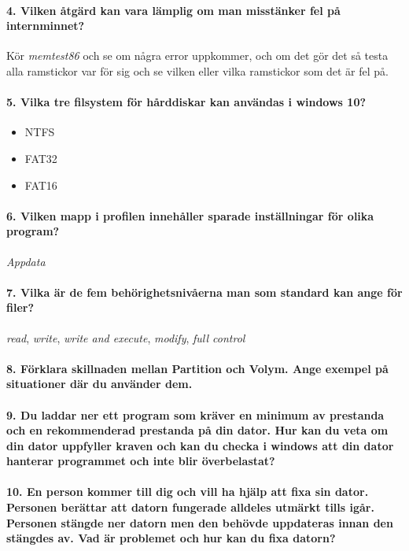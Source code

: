 \paragraph{4. Vilken åtgärd kan vara lämplig om man misstänker fel på internminnet?}
Kör \textit{memtest86} och se om några error uppkommer, och om det gör det så testa alla ramstickor var för sig och se vilken eller vilka ramstickor som det är fel på.

\paragraph{5. Vilka tre filsystem för hårddiskar kan användas i windows 10?}
\begin{itemize}
	\item NTFS
	\item FAT32
	\item FAT16
\end{itemize}

\paragraph{6. Vilken mapp i profilen innehåller sparade inställningar för olika program?}
\textit{Appdata}

\paragraph{7. Vilka är de fem behörighetsnivåerna man som standard kan ange för filer?}
\textit{read}, \textit{write}, \textit{write and execute}, \textit{modify}, \textit{full control}

\paragraph{8. Förklara skillnaden mellan Partition och Volym. Ange exempel på situationer där du använder dem.}

\paragraph{9. Du laddar ner ett program som kräver en minimum av prestanda och en rekommenderad prestanda på din dator. Hur kan du veta om din dator uppfyller kraven och kan du checka i windows att din dator hanterar programmet och inte blir överbelastat?}

\paragraph{10. En person kommer till dig och vill ha hjälp att fixa sin dator. Personen berättar att datorn fungerade alldeles utmärkt tills igår. Personen stängde ner datorn men den behövde uppdateras innan den stängdes av. Vad är problemet och hur kan du fixa datorn?}

